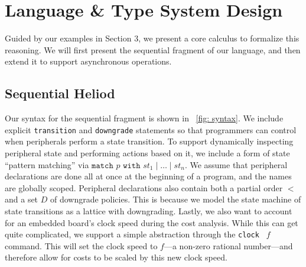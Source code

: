 \section{Language \& Type System Design} 


Guided by our examples in Section 3, we present a core calculus to formalize this reasoning. We will first present the sequential fragment of our language, and then extend it to support asynchronous operations. 

\subsection{Sequential Heliod}
Our syntax for the sequential fragment is shown in ~\autoref{fig: syntax}. We include explicit \texttt{transition} and \texttt{downgrade} statements so that programmers can control when peripherals perform a state transition. To support dynamically inspecting peripheral state and performing actions based on it, we include a form of state ``pattern matching'' via $\texttt{match } p \texttt{ with } st_1 \mid \dots \mid st_n$. We assume that peripheral declarations are done all at once at the beginning of a program, and the names are globally scoped. Peripheral declarations also contain both a partial order $<$ and a set $D$ of downgrade policies. This is because we model the state machine of state transitions as a lattice with downgrading. Lastly, we also want to account for an embedded board's clock speed during the cost analysis. While this can get quite complicated, we support a simple abstraction through the \texttt{clock } $f$ command. This will set the clock speed to $f$---a non-zero rational number---and therefore allow for costs to be scaled by this new clock speed. 

